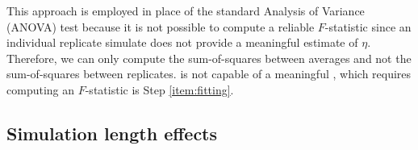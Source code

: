 \documentclass[preprint,review,12pt]{elsarticle}
\begin{document}
    This approach is employed in place of the standard Analysis of Variance (ANOVA) test because it is not possible to compute a reliable $F$-statistic since an individual replicate simulate does not provide a meaningful estimate of $\eta$. Therefore, we can only compute the sum-of-squares between averages and not the sum-of-squares between replicates. is not capable of  a meaningful  , which requires computing an $F$-statistic is   Step \ref{item:fitting}. 
	
	
		
	
	\subsection{Simulation length effects}
	
\end{document}
